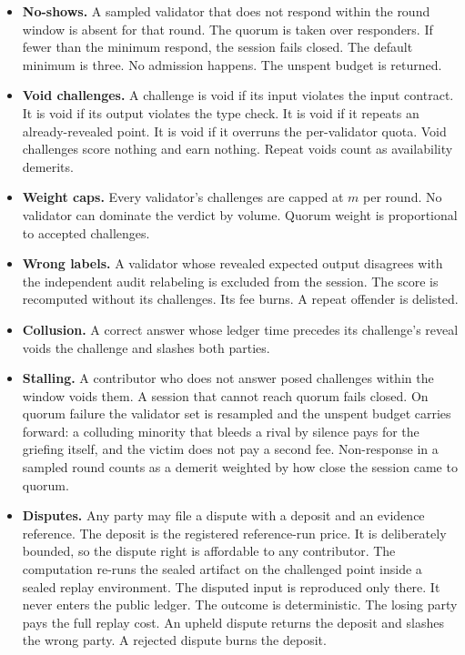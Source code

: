 \documentclass[11pt]{article}
\begin{document}
\begin{itemize}
\item \textbf{No-shows.} A sampled validator that does not respond
within the round window is absent for that round. The quorum is
taken over responders. If fewer than the minimum respond, the
session fails closed. The default minimum is three. No admission
happens. The unspent budget is returned.
\item \textbf{Void challenges.} A challenge is void if its input
violates the input contract. It is void if its output violates
the type check. It is void if it repeats an already-revealed
point. It is void if it overruns the per-validator quota. Void
challenges score nothing and earn nothing. Repeat voids count as
availability demerits.
\item \textbf{Weight caps.} Every validator's challenges are
capped at $m$ per round. No validator can dominate the verdict by
volume. Quorum weight is proportional to accepted challenges.
\item \textbf{Wrong labels.} A validator whose revealed expected
output disagrees with the independent audit relabeling is
excluded from the session. The score is recomputed without its
challenges. Its fee burns. A repeat offender is delisted.
\item \textbf{Collusion.} A correct answer whose ledger time
precedes its challenge's reveal voids the challenge and slashes
both parties.
\item \textbf{Stalling.} A contributor who does not answer posed
challenges within the window voids them. A session that cannot
reach quorum fails closed. On quorum failure the validator set is
resampled and the unspent budget carries forward: a colluding
minority that bleeds a rival by silence pays for the griefing
itself, and the victim does not pay a second fee. Non-response in
a sampled round counts as a demerit weighted by how close the
session came to quorum.
\item \textbf{Disputes.} Any party may file a dispute with a
deposit and an evidence reference. The deposit is the registered
reference-run price. It is deliberately bounded, so the dispute
right is affordable to any contributor. The computation re-runs
the sealed artifact on the challenged point inside a sealed
replay environment. The disputed input is reproduced only there.
It never enters the public ledger. The outcome is deterministic.
The losing party pays the full replay cost. An upheld dispute
returns the deposit and slashes the wrong party. A rejected
dispute burns the deposit.

\end{itemize}
\end{document}
